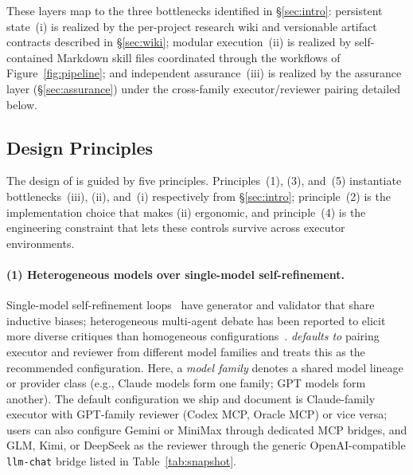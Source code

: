 These layers map to the three bottlenecks identified in \S\ref{sec:intro}: persistent state~(i) is realized by the per-project research wiki and versionable artifact contracts described in \S\ref{sec:wiki}; modular execution~(ii) is realized by self-contained Markdown skill files coordinated through the workflows of Figure~\ref{fig:pipeline}; and independent assurance~(iii) is realized by the assurance layer (\S\ref{sec:assurance}) under the cross-family executor/reviewer pairing detailed below.

\subsection{Design Principles}

The design of \aris{} is guided by five principles.
Principles~(1), (3), and~(5) instantiate bottlenecks~(iii), (ii), and~(i) respectively from \S\ref{sec:intro}; principle~(2) is the implementation choice that makes (ii) ergonomic, and principle~(4) is the engineering constraint that lets these controls survive across executor environments.

\paragraph{(1) Heterogeneous models over single-model self-refinement.}
Single-model self-refinement loops~\citep{madaan2023selfrefine,shinn2023reflexion} have generator and validator that share inductive biases; heterogeneous multi-agent debate has been reported to elicit more diverse critiques than homogeneous configurations~\citep{liang2024divergent,du2024multiagentdebate}.
\aris{} \emph{defaults to} pairing executor and reviewer from different model families and treats this as the recommended configuration.
Here, a \emph{model family} denotes a shared model lineage or provider class (e.g., Claude models form one family; GPT models form another).
The default configuration we ship and document is Claude-family executor with GPT-family reviewer (Codex MCP, Oracle MCP) or vice versa; users can also configure Gemini or MiniMax through dedicated MCP bridges, and GLM, Kimi, or DeepSeek as the reviewer through the generic OpenAI-compatible \texttt{llm-chat} bridge listed in Table~\ref{tab:snapshot}.

